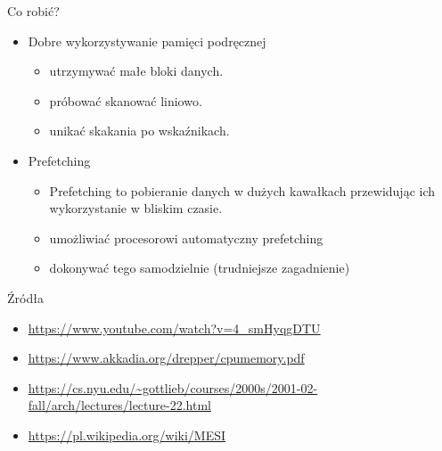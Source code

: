 \documentclass{beamer}
\begin{document}
\begin{frame}{Co robić?}
\begin{itemize}
    \item Dobre wykorzystywanie pamięci podręcznej
    \begin{itemize}
    \pause
        \item utrzymywać małe bloki danych.
    \pause
        \item próbować skanować liniowo.
    \pause
        \item unikać skakania po wskaźnikach.
    \end{itemize}
    \pause
    \item Prefetching
    \begin{itemize}
    \pause
        \item Prefetching to pobieranie danych w dużych kawałkach przewidując ich wykorzystanie w bliskim czasie.
        \pause
        \item umożliwiać procesorowi automatyczny prefetching
        \pause
        \item dokonywać tego samodzielnie (trudniejsze zagadnienie)
    \end{itemize}
\end{itemize}
\end{frame}

\begin{frame}{Źródła}
\begin{itemize}
    \item \url{https://www.youtube.com/watch?v=4_smHyqgDTU}
    \item \url{https://www.akkadia.org/drepper/cpumemory.pdf}
    \item \url{https://cs.nyu.edu/~gottlieb/courses/2000s/2001-02-fall/arch/lectures/lecture-22.html}
    \item
    \url{https://pl.wikipedia.org/wiki/MESI}
\end{itemize}
\end{frame}
\end{document}
